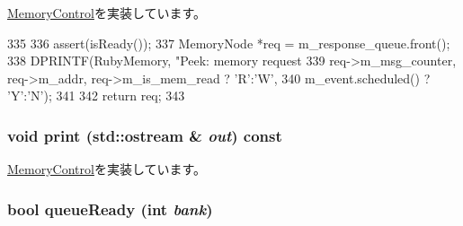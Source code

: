 \hyperlink{classMemoryControl_a1daeb227a1c754432729a75c7997d275}{MemoryControl}を実装しています。


\begin{DoxyCode}
335 {
336     assert(isReady());
337     MemoryNode *req = m_response_queue.front();
338     DPRINTF(RubyMemory, "Peek: memory request%
339             req->m_msg_counter, req->m_addr, req->m_is_mem_read ? 'R':'W',
340             m_event.scheduled() ? 'Y':'N');
341 
342     return req;
343 }
\end{DoxyCode}
\hypertarget{classRubyMemoryControl_ac55fe386a101fbae38c716067c9966a0}{
\subsubsection[{print}]{\setlength{\rightskip}{0pt plus 5cm}void print (std::ostream \& {\em out}) const}}
\label{classRubyMemoryControl_ac55fe386a101fbae38c716067c9966a0}


\hyperlink{classMemoryControl_a3ea5f7af5db62cc24f4e40df9ea5c971}{MemoryControl}を実装しています。\hypertarget{classRubyMemoryControl_a839c1841354bab0a9007a04ba303ae2c}{
\subsubsection[{queueReady}]{\setlength{\rightskip}{0pt plus 5cm}bool queueReady (int {\em bank})}}
\label{classRubyMemoryControl_a839c1841354bab0a9007a04ba303ae2c}




